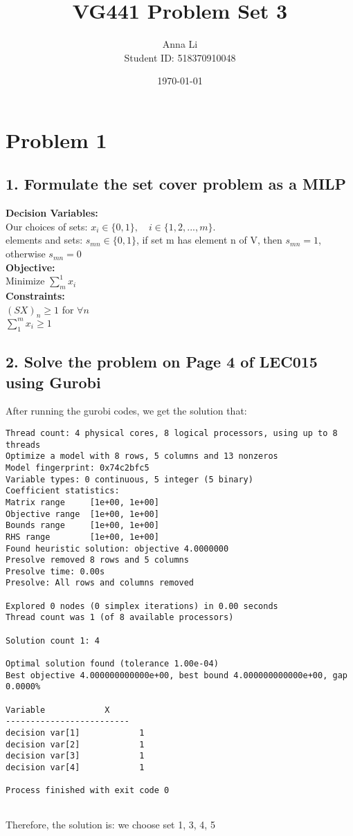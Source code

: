 \documentclass[a4paper,12pt]{journal}
\title{VG441 Problem Set 3}
\author{Anna Li \\Student ID: 518370910048}
\date{\today}
\begin{document}
	\maketitle
	\section*{Problem 1}
	\subsection*{1. Formulate the set cover problem as a MILP}
	\textbf{Decision Variables:}\\
	Our choices of sets: $x_i\in \{0,1\},\quad i\in\{1,2,...,m\}$.\\
	elements and sets: $s_{mn}\in\{0,1\}$, if set m has element n of V, then $s_{mn}=1$, otherwise $s_{mn}=0$\\
	\textbf{Objective:}\\
	Minimize $\sum_{m}^{1}x_i$\\
	\textbf{Constraints:}\\
	$(SX)_{n}\geq 1$ for $\forall n$\\
	$\sum_{1}^{m}x_i\geq 1$
	\subsection*{2. Solve the problem on Page 4 of LEC015 using Gurobi}
	After running the gurobi codes, we get the solution that:
	\begin{lstlisting}
Thread count: 4 physical cores, 8 logical processors, using up to 8 threads
Optimize a model with 8 rows, 5 columns and 13 nonzeros
Model fingerprint: 0x74c2bfc5
Variable types: 0 continuous, 5 integer (5 binary)
Coefficient statistics:
Matrix range     [1e+00, 1e+00]
Objective range  [1e+00, 1e+00]
Bounds range     [1e+00, 1e+00]
RHS range        [1e+00, 1e+00]
Found heuristic solution: objective 4.0000000
Presolve removed 8 rows and 5 columns
Presolve time: 0.00s
Presolve: All rows and columns removed

Explored 0 nodes (0 simplex iterations) in 0.00 seconds
Thread count was 1 (of 8 available processors)

Solution count 1: 4 

Optimal solution found (tolerance 1.00e-04)
Best objective 4.000000000000e+00, best bound 4.000000000000e+00, gap 0.0000%

Variable            X 
-------------------------
decision var[1]            1 
decision var[2]            1 
decision var[3]            1 
decision var[4]            1 

Process finished with exit code 0
	
	\end{lstlisting}
Therefore, the solution is:
we choose set 1, 3, 4, 5
\end{document}
